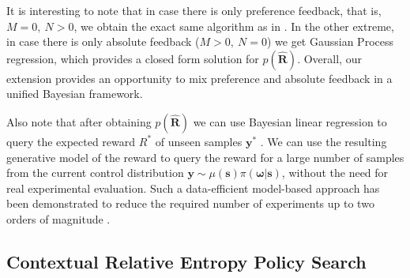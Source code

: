 It is interesting to note that in case there is only preference feedback, that is, $M=0,~N>0$, we obtain the exact same algorithm as in \citep{Chu_ICML_2005}. In the other extreme, in case there is only absolute feedback ($M>0,~N=0$) we get Gaussian Process regression, which provides a closed form solution for
$p(\hat{\boldsymbol{R}})$. Overall, our extension provides an opportunity to mix preference and absolute feedback in a unified Bayesian framework. 

Also note that after obtaining $p(\hat{\boldsymbol{R}})$ we can use Bayesian linear regression to query the expected reward $R^*$ of unseen samples $\boldsymbol{y}^*$
\cite{Chu_ICML_2005, Rasmussen2006}. We can use the resulting generative model of the reward to query the reward for a large number of samples from the current control distribution $  {\boldsymbol{y}}  \sim \mu(  {\boldsymbol{s}} )\pi( {\boldsymbol{\omega}} |  {\boldsymbol{s}} )$, without the need for real experimental evaluation. Such a data-efficient model-based approach has been demonstrated to reduce the required number of experiments up to two orders of magnitude  \citep{Kupcsik2013,Daniel_RSS_2014}. 

\subsection{Contextual Relative Entropy Policy Search}

